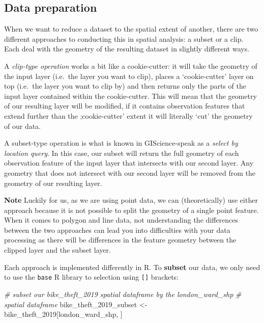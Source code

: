 \documentclass[
]{book}
\newenvironment{Shaded}{\begin{snugshade}}{\end{snugshade}}
\newcommand{\CommentTok}[1]{\textcolor[rgb]{0.56,0.35,0.01}{\textit{#1}}}
\newcommand{\NormalTok}[1]{#1}
\newcommand{\OtherTok}[1]{\textcolor[rgb]{0.56,0.35,0.01}{#1}}
\begin{document}
\hypertarget{data-preparation-w06}{%
\subsection{Data preparation}\label{data-preparation-w06}}

When we want to reduce a dataset to the spatial extent of another, there are two different approaches to conducting this in spatial analysis: a subset or a clip. Each deal with the geometry of the resulting dataset in slightly different ways.

A \emph{clip-type operation} works a bit like a cookie-cutter: it will take the geometry of the input layer (i.e.~the layer you want to clip), places a `cookie-cutter' layer on top (i.e.~the layer you want to clip by) and then returns only the parts of the input layer contained within the cookie-cutter. This will mean that the geometry of our resulting layer will be modified, if it contains observation features that extend further than the ;cookie-cutter' extent it will literally `cut' the geometry of our data.

A subset-type operation is what is known in GIScience-speak as a \emph{select by location query}. In this case, our subset will return the full geometry of each observation feature of the input layer that intersects with our second layer. Any geometry that does not intersect with our second layer will be removed from the geometry of our resulting layer.

\textbf{Note}
Luckily for us, as we are using point data, we can (theoretically) use either approach because it is not possible to split the geometry of a single point feature. When it comes to polygon and line data, not understanding the differences between the two approaches can lead you into difficulties with your data processing as there will be differences in the feature geometry between the clipped layer and the subset layer.

Each approach is implemented differently in R. To \textbf{subset} our data, we only need to use the \texttt{base} R library to selection using \texttt{{[}{]}} brackets:

\begin{Shaded}
\begin{Highlighting}[]
\CommentTok{\# subset our bike\_theft\_2019 spatial dataframe by the london\_ward\_shp}
\CommentTok{\# spatial dataframe}
\NormalTok{bike\_theft\_2019\_subset }\OtherTok{\textless{}{-}}\NormalTok{ bike\_theft\_2019[london\_ward\_shp, ]}
\end{Highlighting}
\end{Shaded}
\end{document}

